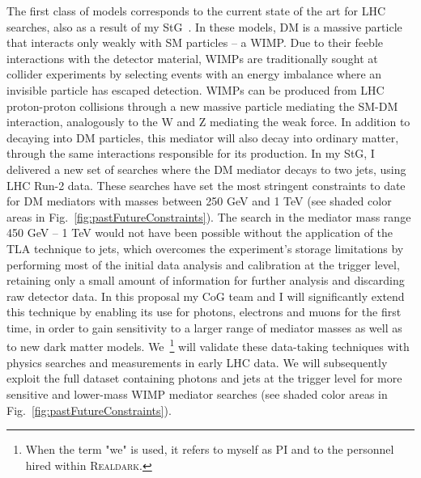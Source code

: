 \documentclass[11pt,a4paper]{article}
\begin{document}
The first class of models corresponds to the current state of the art for LHC searches, also as a result of my StG~\cite{Abercrombie:2015wmb,Boveia:2018yeb}. 
In these models, DM is a massive particle that interacts only weakly with SM particles -- a WIMP. 
Due to their feeble interactions with the detector material, WIMPs are traditionally sought at collider experiments by selecting events with an energy imbalance where an invisible particle has escaped detection. 
WIMPs can be produced from LHC proton-proton collisions through a new massive particle mediating the SM-DM interaction, analogously to the W and Z mediating the weak force. In addition to decaying into DM particles, this mediator will also decay into ordinary matter, through the same interactions responsible for its production. 
In my StG, I delivered a new set of searches where the DM mediator decays to two jets, using LHC Run-2 data. 
These searches have set the most stringent constraints to date for DM mediators with masses between 250 GeV and 1 TeV (see shaded \color{red} color \color{black} areas in Fig.~\ref{fig:pastFutureConstraints}). 
The search in the mediator mass range 450 GeV -- 1 TeV would not have been possible without the application of the TLA technique to jets, which overcomes the experiment's storage limitations by performing most of the initial data analysis and calibration at the trigger level, retaining only a small amount of information for further analysis and discarding raw detector data. 
In this proposal my CoG team and I will significantly extend this technique by enabling its use for photons, electrons and muons for the first time, in order to gain sensitivity to a larger range of mediator masses as well as to new dark matter models. 
We~\footnote{When the term "we" is used, it refers to myself as PI and to the personnel hired within \textsc{Realdark}.} will validate these data-taking techniques with physics searches and measurements in early LHC data. 
We will subsequently exploit the full dataset containing photons and jets at the trigger level for more sensitive and lower-mass WIMP mediator searches (see shaded \color{red} color \color{black} areas in Fig.~\ref{fig:pastFutureConstraints}). 
\end{document}
